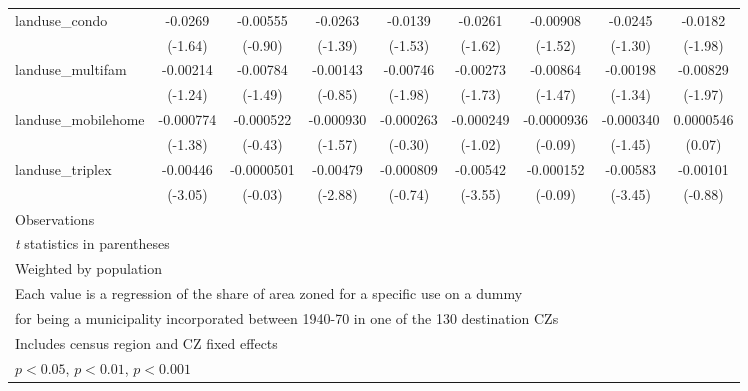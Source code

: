 \begin{table}[htbp]
\begin{tabular}{l*{8}{c}}
\addlinespace
landuse\_condo       &     -0.0269         &    -0.00555         &     -0.0263         &     -0.0139         &     -0.0261         &    -0.00908         &     -0.0245         &     -0.0182\sym{*}  \\
                    &     (-1.64)         &     (-0.90)         &     (-1.39)         &     (-1.53)         &     (-1.62)         &     (-1.52)         &     (-1.30)         &     (-1.98)         \\
\addlinespace
landuse\_multifam    &    -0.00214         &    -0.00784         &    -0.00143         &    -0.00746\sym{*}  &    -0.00273         &    -0.00864         &    -0.00198         &    -0.00829\sym{*}  \\
                    &     (-1.24)         &     (-1.49)         &     (-0.85)         &     (-1.98)         &     (-1.73)         &     (-1.47)         &     (-1.34)         &     (-1.97)         \\
\addlinespace
landuse\_mobilehome  &   -0.000774         &   -0.000522         &   -0.000930         &   -0.000263         &   -0.000249         &  -0.0000936         &   -0.000340         &   0.0000546         \\
                    &     (-1.38)         &     (-0.43)         &     (-1.57)         &     (-0.30)         &     (-1.02)         &     (-0.09)         &     (-1.45)         &      (0.07)         \\
\addlinespace
landuse\_triplex     &    -0.00446\sym{**} &  -0.0000501         &    -0.00479\sym{**} &   -0.000809         &    -0.00542\sym{***}&   -0.000152         &    -0.00583\sym{***}&    -0.00101         \\
                    &     (-3.05)         &     (-0.03)         &     (-2.88)         &     (-0.74)         &     (-3.55)         &     (-0.09)         &     (-3.45)         &     (-0.88)         \\
\midrule
Observations        &                     &                     &                     &                     &                     &                     &                     &                     \\
\bottomrule
\multicolumn{9}{l}{\footnotesize \textit{t} statistics in parentheses}\\
\multicolumn{9}{l}{\footnotesize Weighted by population}\\
\multicolumn{9}{l}{\footnotesize Each value is a regression of the share of area zoned for a specific use on a dummy}\\
\multicolumn{9}{l}{\footnotesize for being a municipality incorporated between 1940-70 in one of the 130 destination CZs}\\
\multicolumn{9}{l}{\footnotesize Includes census region and CZ fixed effects}\\
\multicolumn{9}{l}{\footnotesize \sym{*} \(p<0.05\), \sym{**} \(p<0.01\), \sym{***} \(p<0.001\)}\\
\end{tabular}
\end{table}
